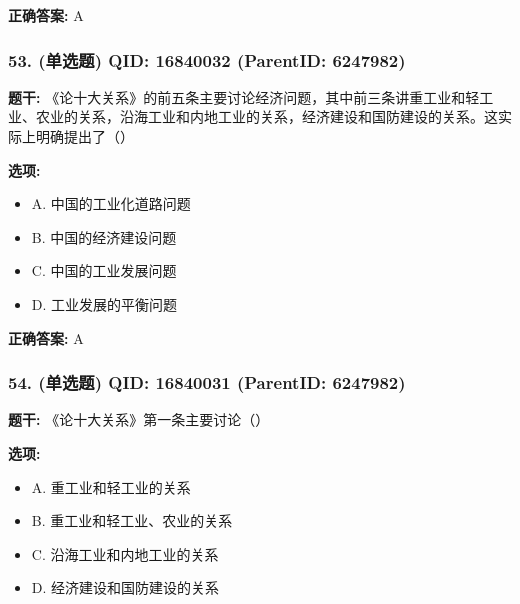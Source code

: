 \documentclass[12pt,UTF8]{ctexart}
\begin{document}
\textbf{正确答案:}
A

\vspace{0.3em}\hrulefill\vspace{0.7em}

\subsubsection*{53. (单选题) \small QID: 16840032 (ParentID: 6247982)}

\textbf{题干:}
《论十大关系》的前五条主要讨论经济问题，其中前三条讲重工业和轻工业、农业的关系，沿海工业和内地工业的关系，经济建设和国防建设的关系。这实际上明确提出了（）



\textbf{选项:}
\begin{itemize}[leftmargin=*]

  \item A. 中国的工业化道路问题

  \item B. 中国的经济建设问题

  \item C. 中国的工业发展问题

  \item D. 工业发展的平衡问题

\end{itemize}

\textbf{正确答案:}
A

\vspace{0.3em}\hrulefill\vspace{0.7em}

\subsubsection*{54. (单选题) \small QID: 16840031 (ParentID: 6247982)}

\textbf{题干:}
《论十大关系》第一条主要讨论（）



\textbf{选项:}
\begin{itemize}[leftmargin=*]

  \item A. 重工业和轻工业的关系

  \item B. 重工业和轻工业、农业的关系

  \item C. 沿海工业和内地工业的关系

  \item D. 经济建设和国防建设的关系

\end{itemize}
\end{document}
